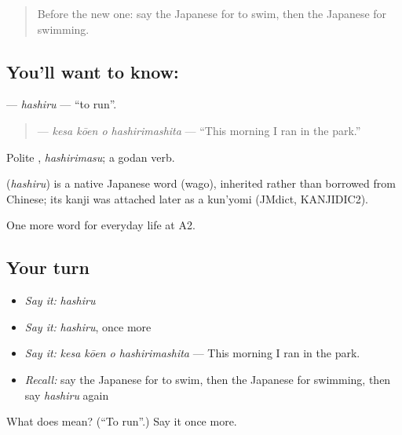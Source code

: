 \begin{quote}
Before the new one: say the Japanese for to swim, then the Japanese for swimming.
\end{quote}

\subsection*{You'll want to know: }
\textbf{} — \emph{hashiru} — \textquotedblleft{}to run\textquotedblright{}.

\begin{quote}
\textbf{  } — \emph{kesa kōen o hashirimashita} — \textquotedblleft{}This morning I ran in the park.\textquotedblright{}
\end{quote}

Polite \textbf{}, \emph{hashirimasu}; a godan verb.

\begin{cousinweb}
\textbf{} (\emph{hashiru}) is a native Japanese word (wago), inherited rather than borrowed from Chinese; its kanji was attached later as a kun'yomi (JMdict, KANJIDIC2).
\end{cousinweb}

\begin{grammarlens}[title={What you've built}]
One more word for everyday life at A2.
\end{grammarlens}

\subsection*{Your turn}
\begin{itemize}
\raggedright
  \item \emph{Say it:} \emph{hashiru}
  \item \emph{Say it:} \emph{hashiru}, once more
  \item \emph{Say it:} \emph{kesa kōen o hashirimashita} — This morning I ran in the park.
  \item \emph{Recall:} say the Japanese for to swim, then the Japanese for swimming, then say \emph{hashiru} again
\end{itemize}

\begin{tcolorbox}[breakable,colback=teal!4,colframe=teal!35!black,title={Before you move on}]
What does  mean? (\textquotedblleft{}To run\textquotedblright{}.) Say it once more.
\end{tcolorbox}
